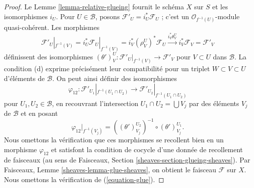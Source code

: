 \begin{proof}
Le Lemme \ref{lemma-relative-glueing} fournit le schéma $X$ sur $S$ et les
isomorphismes $i_U$. Pour $U \in \mathcal{B}$, posons
$\mathcal{F}'_U = i_U^*\mathcal{F}_U$ ; c'est un
$\mathcal{O}_{f^{-1}(U)}$-module quasi-cohérent. Les morphismes
$$
\mathcal{F}'_U|_{f^{-1}(V)} =
i_U^*\mathcal{F}_U|_{f^{-1}(V)} =
i_V^*(\rho^U_V)^*\mathcal{F}_U \xrightarrow{i_V^*\theta^U_V}
i_V^*\mathcal{F}_V = \mathcal{F}'_V
$$
définissent des isomorphismes
$(\theta')^U_V : \mathcal{F}'_U|_{f^{-1}(V)} \to \mathcal{F}'_V$
pour $V \subset U$ dans $\mathcal{B}$. La condition (d) exprime précisément
leur compatibilité pour un triplet $W \subset V \subset U$ d'éléments de
$\mathcal{B}$. On peut ainsi définir des isomorphismes
$$
\varphi_{12} :
\mathcal{F}'_{U_1}|_{f^{-1}(U_1 \cap U_2)}
\longrightarrow
\mathcal{F}'_{U_2}|_{f^{-1}(U_1 \cap U_2)}
$$
pour $U_1, U_2 \in \mathcal{B}$, en recouvrant l'intersection
$U_1 \cap U_2 = \bigcup V_j$ par des éléments $V_j$ de $\mathcal{B}$ et en
posant
$$
\varphi_{12}|_{f^{-1}(V_j)} =
\left((\theta')^{U_2}_{V_j}\right)^{-1}
\circ
(\theta')^{U_1}_{V_j}.
$$
Nous omettons la vérification que ces morphismes se recollent bien en un
morphisme $\varphi_{12}$ et satisfont la condition de cocycle d'une donnée
de recollement de faisceaux (au sens de Faisceaux,
Section \ref{sheaves-section-glueing-sheaves}). Par Faisceaux,
Lemme \ref{sheaves-lemma-glue-sheaves}, on obtient le faisceau
$\mathcal{F}$ sur $X$. Nous omettons la vérification de
(\ref{equation-glue}).
\end{proof}

